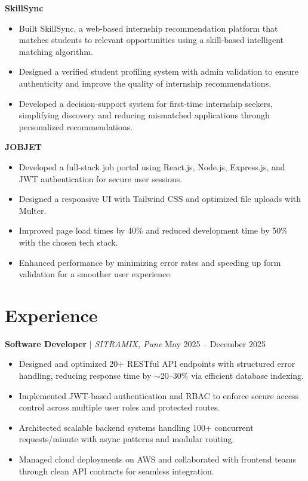 \documentclass[a4paper,10pt]{article}
\begin{document}
\vspace{6pt}

\textbf{SkillSync}\\
\vspace{-6pt}
\begin{itemize}
    \item Built SkillSync, a web-based internship recommendation platform that matches students to relevant opportunities using a skill-based intelligent matching algorithm.
    \item Designed a verified student profiling system with admin validation to ensure authenticity and improve the quality of internship recommendations.
    \item Developed a decision-support system for first-time internship seekers, simplifying discovery and reducing mismatched applications through personalized recommendations.
\end{itemize}

\vspace{6pt}

\textbf{JOBJET}\\
\vspace{-6pt}
\begin{itemize}
    \item Developed a full-stack job portal using React.js, Node.js, Express.js, and JWT authentication for secure user sessions.
    \item Designed a responsive UI with Tailwind CSS and optimized file uploads with Multer.
    \item Improved page load times by 40\% and reduced development time by 50\% with the chosen tech stack.
    \item Enhanced performance by minimizing error rates and speeding up form validation for a smoother user experience.
\end{itemize}

\section*{Experience}
\textbf{Software Developer} $|$ \textit{SITRAMIX, Pune} \hfill May 2025 -- December 2025
\begin{itemize}
    \item Designed and optimized 20+ RESTful API endpoints with structured error handling, reducing response time by $\sim$20--30\% via efficient database indexing.
    \item Implemented JWT-based authentication and RBAC to enforce secure access control across multiple user roles and protected routes.
    \item Architected scalable backend systems handling 100+ concurrent requests/minute with async patterns and modular routing.
    \item Managed cloud deployments on AWS and collaborated with frontend teams through clean API contracts for seamless integration.
\end{itemize}
\end{document}
